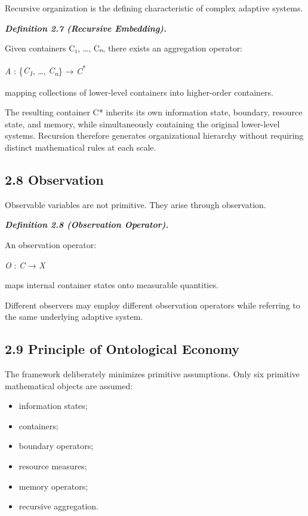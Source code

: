 \documentclass[
]{article}
\begin{document}
Recursive organization is the defining characteristic of complex
adaptive systems.

\emph{\textbf{Definition 2.7 (Recursive Embedding).}}

Given containers C₁, \ldots, Cₙ, there exists an aggregation operator:

\emph{A} : \{\emph{C\textsubscript{1}}, \ldots,
\emph{C\textsubscript{n}}\} → \emph{C}\textsuperscript{*}

mapping collections of lower-level containers into higher-order
containers.

The resulting container C* inherits its own information state, boundary,
resource state, and memory, while simultaneously containing the original
lower-level systems. Recursion therefore generates organizational
hierarchy without requiring distinct mathematical rules at each scale.

\hypertarget{observation}{%
\subsection{2.8 Observation}\label{observation}}

Observable variables are not primitive. They arise through observation.

\emph{\textbf{Definition 2.8 (Observation Operator).}}

An observation operator:

\emph{O} : \emph{C} → \emph{X}

maps internal container states onto measurable quantities.

Different observers may employ different observation operators while
referring to the same underlying adaptive system.

\hypertarget{principle-of-ontological-economy}{%
\subsection{2.9 Principle of Ontological
Economy}\label{principle-of-ontological-economy}}

The framework deliberately minimizes primitive assumptions. Only six
primitive mathematical objects are assumed:

\begin{itemize}
\item
  information states;
\item
  containers;
\item
  boundary operators;
\item
  resource measures;
\item
  memory operators;
\item
  recursive aggregation.
\end{itemize}
\end{document}

